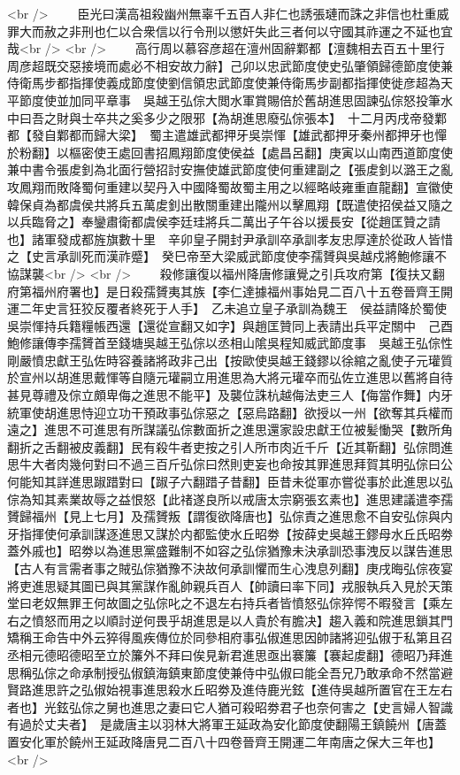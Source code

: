 <br />
　　臣光曰漢高祖殺幽州無辜千五百人非仁也誘張璉而誅之非信也杜重威罪大而赦之非刑也仁以合衆信以行令刑以懲奸失此三者何以守國其祚運之不延也宜哉<br />
<br />
　　高行周以慕容彦超在澶州固辭鄴都【澶魏相去百五十里行周彦超既交惡接境而處必不相安故力辭】己卯以忠武節度使史弘肇領歸德節度使兼侍衛馬步都指揮使義成節度使劉信領忠武節度使兼侍衛馬步副都指揮使徙彦超為天平節度使並加同平章事　吳越王弘倧大閲水軍賞賜倍於舊胡進思固諫弘倧怒投筆水中曰吾之財與士卒共之奚多少之限邪【為胡進思廢弘倧張本】　十二月丙戌帝發鄴都【發自鄴都而歸大梁】　蜀主遣雄武都押牙吳崇惲【雄武都押牙秦州都押牙也憚於粉翻】以樞密使王處回書招鳳翔節度使侯益【處昌呂翻】庚寅以山南西道節度使兼中書令張䖍釗為北面行營招討安撫使雄武節度使何重建副之【張䖍釗以潞王之亂攻鳳翔而敗降蜀何重建以契丹入中國降蜀故蜀主用之以經略岐雍重直龍翻】宣徽使韓保貞為都虞侯共將兵五萬䖍釗出散關重建出隴州以擊鳳翔【既遣使招侯益又隨之以兵臨脅之】奉鑾肅衛都虞侯李廷珪將兵二萬出子午谷以援長安【從趙匡贊之請也】諸軍發成都旌旗數十里　辛卯皇子開封尹承訓卒承訓孝友忠厚達於從政人皆惜之【史言承訓死而漢祚蹙】　癸巳帝至大梁威武節度使李孺贇與吳越戍將鮑修讓不協謀襲<br />
<br />
　　殺修讓復以福州降唐修讓覺之引兵攻府第【復扶又翻府第福州府署也】是日殺孺贇夷其族【李仁達據福州事始見二百八十五卷晉齊王開運二年史言狂狡反覆者終死于人手】　乙未追立皇子承訓為魏王　侯益請降於蜀使吳崇惲持兵籍糧帳西還【還從宣翻又如字】與趙匡贊同上表請出兵平定關中　己酉鮑修讓傳李孺贇首至錢塘吳越王弘倧以丞相山隂吳程知威武節度事　吳越王弘倧性剛嚴憤忠獻王弘佐時容養諸將政非己出【按歐使吳越王錢鏐以徐綰之亂使子元瓘質於宣州以胡進思戴惲等自隨元瓘嗣立用進思為大將元瓘卒而弘佐立進思以舊將自待甚見尊禮及倧立頗卑侮之進思不能平】及襲位誅杭越侮法吏三人【侮當作舞】内牙統軍使胡進思恃迎立功干預政事弘倧惡之【惡烏路翻】欲授以一州【欲奪其兵權而遠之】進思不可進思有所謀議弘倧數面折之進思還家設忠獻王位被髪慟哭【數所角翻折之舌翻被皮義翻】民有殺牛者吏按之引人所市肉近千斤【近其靳翻】弘倧問進思牛大者肉幾何對曰不過三百斤弘倧曰然則吏妄也命按其罪進思拜賀其明弘倧曰公何能知其詳進思踧踖對曰【踧子六翻踖子昔翻】臣昔未從軍亦嘗從事於此進思以弘倧為知其素業故辱之益恨怒【此禇遂良所以戒唐太宗窮張玄素也】進思建議遣李孺贇歸福州【見上七月】及孺贇叛【謂復欲降唐也】弘倧責之進思愈不自安弘倧與内牙指揮使何承訓謀逐進思又謀於内都監使水丘昭劵【按薛史吳越王鏐母水丘氏昭劵蓋外戚也】昭劵以為進思黨盛難制不如容之弘倧猶豫未決承訓恐事洩反以謀告進思【古人有言需者事之賊弘倧猶豫不決故何承訓懼而生心洩息列翻】庚戌晦弘倧夜宴將吏進思疑其圖已與其黨謀作亂帥親兵百人【帥讀曰率下同】戎服執兵入見於天策堂曰老奴無罪王何故圖之弘倧叱之不退左右持兵者皆憤怒弘倧猝愕不暇發言【乘左右之憤怒而用之以順討逆何畏乎胡進思是以人貴於有膽决】趨入義和院進思鎖其門矯稱王命告中外云猝得風疾傳位於同參相府事弘俶進思因帥諸將迎弘俶于私第且召丞相元德昭德昭至立於簾外不拜曰俟見新君進思亟出褰簾【褰起䖍翻】德昭乃拜進思稱弘倧之命承制授弘俶鎮海鎮東節度使兼侍中弘俶曰能全吾兄乃敢承命不然當避賢路進思許之弘俶始視事進思殺水丘昭劵及進侍鹿光鉉【進侍吳越所置官在王左右者也】光鉉弘倧之舅也進思之妻曰它人猶可殺昭劵君子也奈何害之【史言婦人智識有過於丈夫者】　是歲唐主以羽林大將軍王延政為安化節度使翻陽王鎮饒州【唐蓋置安化軍於饒州王延政降唐見二百八十四卷晉齊王開運二年南唐之保大三年也】<br />

